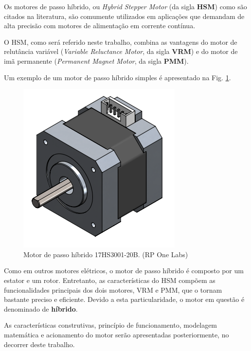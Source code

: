 Os motores de passo híbrido, ou \textit{Hybrid Stepper Motor} (da sigla \textbf{HSM}) como são citados na literatura, são comumente utilizados em aplicações que demandam de alta precisão com motores de alimentação em corrente contínua. \cite{ieeeRusso}
	
	O HSM, como será referido neste trabalho, combina as vantagens do motor de relutância variável (\textit{Variable Reluctance Motor}, da sigla \textbf{VRM}) e do motor de imã permanente (\textit{Permanent Magnet Motor}, da sigla \textbf{PMM}).
	
	Um exemplo de um motor de passo híbrido simples é apresentado na Fig. \ref{HSMgrafico}.
	
	\begin{figure}[H]
		\centering
		\includegraphics[scale=0.3]{Images/HSMmodel.png}
		\caption{Motor de passo híbrido 17HS3001-20B. (RP One Labs)}
		\label{HSMgrafico}
	\end{figure}  
	
	Como em outros motores elétricos, o motor de passo híbrido é composto por um estator e um rotor. Entretanto, as características do HSM compõem as funcionalidades principais dos dois motores, VRM e PMM, que o tornam bastante preciso e eficiente. Devido a esta particularidade, o motor em questão é denominado de \textbf{híbrido}.
	
	As características construtivas, princípio de funcionamento, modelagem matemática e acionamento do motor serão apresentadas posteriormente, no decorrer deste trabalho. 